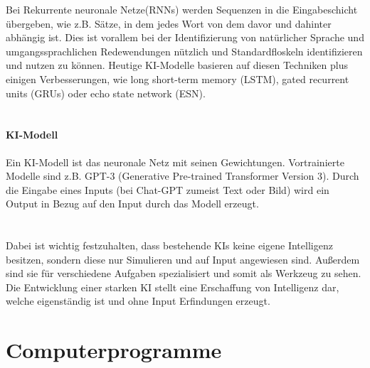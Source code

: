 Bei Rekurrente neuronale Netze(RNNs) werden Sequenzen in die Eingabeschicht übergeben, 
wie z.B. Sätze, 
in dem jedes Wort von dem davor und dahinter abhängig ist. 
Dies ist vorallem bei der Identifizierung von natürlicher Sprache 
und umgangssprachlichen Redewendungen nützlich und  
Standardfloskeln identifizieren und nutzen zu können.
\cite{WasSindRekurrente2023}
Heutige KI-Modelle basieren auf diesen Techniken plus einigen Verbesserungen,
wie long short-term memory (LSTM), gated recurrent units (GRUs) 
oder echo state network (ESN).
\\
\\
\paragraph{KI-Modell}
Ein KI-Modell ist das neuronale Netz mit seinen Gewichtungen. 
Vortrainierte Modelle sind z.B. GPT-3 (Generative Pre-trained Transformer Version 3).
\cite{KuenstlicheIntelligenzKI}
Durch die Eingabe eines Inputs (bei Chat-GPT zumeist Text oder Bild) 
wird ein Output in Bezug auf den Input durch das Modell erzeugt.
\\
\\
\paragraph{}
Dabei ist wichtig festzuhalten, dass bestehende KIs keine 
eigene Intelligenz besitzen, sondern diese nur Simulieren 
und auf Input angewiesen sind. Außerdem sind sie für 
verschiedene Aufgaben spezialisiert und somit als Werkzeug zu sehen. 
Die Entwicklung einer starken KI stellt eine Erschaffung von Intelligenz dar,
welche eigenständig ist und ohne Input Erfindungen erzeugt.



\newpage

\section{Computerprogramme\label{sec:comp}}

